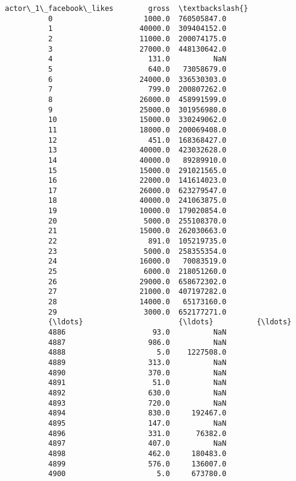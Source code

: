 \documentclass[11pt]{article}
\begin{document}
\begin{Verbatim}[commandchars=\\\{\}]
                actor\_1\_facebook\_likes        gross  \textbackslash{}
          0                     1000.0  760505847.0   
          1                    40000.0  309404152.0   
          2                    11000.0  200074175.0   
          3                    27000.0  448130642.0   
          4                      131.0          NaN   
          5                      640.0   73058679.0   
          6                    24000.0  336530303.0   
          7                      799.0  200807262.0   
          8                    26000.0  458991599.0   
          9                    25000.0  301956980.0   
          10                   15000.0  330249062.0   
          11                   18000.0  200069408.0   
          12                     451.0  168368427.0   
          13                   40000.0  423032628.0   
          14                   40000.0   89289910.0   
          15                   15000.0  291021565.0   
          16                   22000.0  141614023.0   
          17                   26000.0  623279547.0   
          18                   40000.0  241063875.0   
          19                   10000.0  179020854.0   
          20                    5000.0  255108370.0   
          21                   15000.0  262030663.0   
          22                     891.0  105219735.0   
          23                    5000.0  258355354.0   
          24                   16000.0   70083519.0   
          25                    6000.0  218051260.0   
          26                   29000.0  658672302.0   
          27                   21000.0  407197282.0   
          28                   14000.0   65173160.0   
          29                    3000.0  652177271.0   
          {\ldots}                      {\ldots}          {\ldots}   
          4886                    93.0          NaN   
          4887                   986.0          NaN   
          4888                     5.0    1227508.0   
          4889                   313.0          NaN   
          4890                   370.0          NaN   
          4891                    51.0          NaN   
          4892                   630.0          NaN   
          4893                   720.0          NaN   
          4894                   830.0     192467.0   
          4895                   147.0          NaN   
          4896                   331.0      76382.0   
          4897                   407.0          NaN   
          4898                   462.0     180483.0   
          4899                   576.0     136007.0   
          4900                     5.0     673780.0   

\end{Verbatim}
\end{document}
